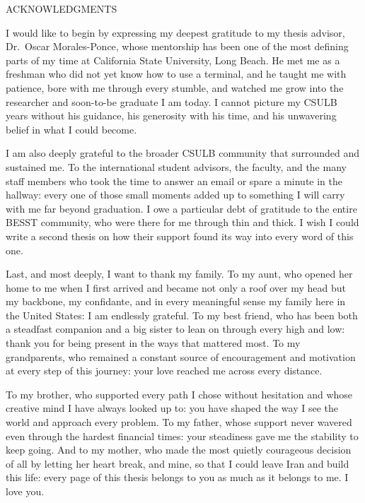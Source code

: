\clearpage
{}
{}
\begin{center}
ACKNOWLEDGMENTS
\end{center}

\begin{doublespacing}

	I would like to begin by expressing my deepest gratitude to my thesis
advisor, Dr.\ Oscar Morales-Ponce, whose mentorship has been one of the
most defining parts of my time at California State University, Long
Beach.
He met me as a freshman who did not yet know how to use a terminal, and
he taught me with patience, bore with me through every stumble, and
watched me grow into the researcher and soon-to-be graduate I am today.
I cannot picture my CSULB years without his guidance, his generosity
with his time, and his unwavering belief in what I could become.

	I am also deeply grateful to the broader CSULB community that
surrounded and sustained me.
To the international student advisors, the faculty, and the many staff
members who took the time to answer an email or spare a minute in the
hallway: every one of those small moments added up to something I will
carry with me far beyond graduation.
I owe a particular debt of gratitude to the entire BESST community, who were there for me through thin and thick. I wish I could write a second thesis on how their support found its
way into every word of this one. 

	Last, and most deeply, I want to thank my family.
To my aunt, who opened her home to me when I first arrived and became
not only a roof over my head but my backbone, my confidante, and in
every meaningful sense my family here in the United States: I am
endlessly grateful.
To my best friend, who has been both a steadfast companion and a big
sister to lean on through every high and low: thank you for being
present in the ways that mattered most.
To my grandparents, who remained a constant source of encouragement
and motivation at every step of this journey: your love reached me
across every distance.

	To my brother, who supported every path I chose without hesitation
and whose creative mind I have always looked up to: you have shaped
the way I see the world and approach every problem.
To my father, whose support never wavered even through the hardest
financial times: your steadiness gave me the stability to keep going.
And to my mother, who made the most quietly courageous decision of all
by letting her heart break, and mine, so that I could leave Iran and
build this life: every page of this thesis belongs to you as much as
it belongs to me.
I love you.

\end{doublespacing}
\clearpage
